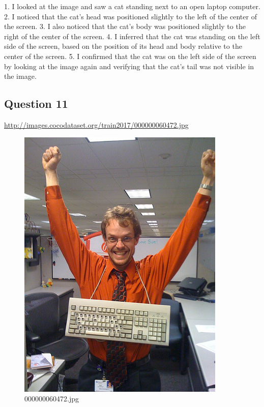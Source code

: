 \begin{enumerate}
        1. I looked at the image and saw a cat standing next to an open laptop computer.
        2. I noticed that the cat’s head was positioned slightly to the left of the center of the screen.
        3. I also noticed that the cat’s body was positioned slightly to the right of the center of the screen.
        4. I inferred that the cat was standing on the left side of the screen, based on the position of its head and body relative to the center of the screen.
        5. I confirmed that the cat was on the left side of the screen by looking at the image again and verifying that the cat’s tail was not visible in the image.
        
    \end{enumerate}
\subsection*{Question 11}
\url{http://images.cocodataset.org/train2017/000000060472.jpg}
    \begin{figure}[h]
        \centering
        \includegraphics[width=0.8\linewidth]{../image set/easy/000000060472.jpg}
        \caption{000000060472.jpg}
    \end{figure}
